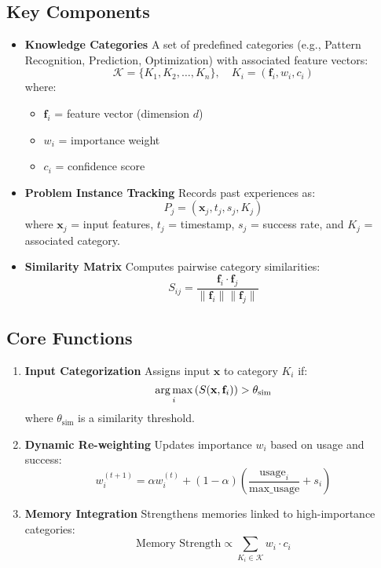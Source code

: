 \documentclass{article}
\begin{document}
\subsection{Key Components}
\begin{itemize}
    \item \textbf{Knowledge Categories}  
    A set of predefined categories (e.g., Pattern Recognition, Prediction, Optimization) with associated feature vectors:
    \[
    \mathcal{K} = \{K_1, K_2, \dots, K_n\}, \quad K_i = (\mathbf{f}_i, w_i, c_i)
    \]
    where:
    \begin{itemize}
        \item $\mathbf{f}_i$ = feature vector (dimension $d$)
        \item $w_i$ = importance weight
        \item $c_i$ = confidence score
    \end{itemize}

    \item \textbf{Problem Instance Tracking}  
    Records past experiences as:
    \[
    P_j = (\mathbf{x}_j, t_j, s_j, K_j)
    \]
    where $\mathbf{x}_j$ = input features, $t_j$ = timestamp, $s_j$ = success rate, and $K_j$ = associated category.

    \item \textbf{Similarity Matrix}  
    Computes pairwise category similarities:
    \[
    S_{ij} = \frac{\mathbf{f}_i \cdot \mathbf{f}_j}{\|\mathbf{f}_i\| \|\mathbf{f}_j\|}
    \]
\end{itemize}

\newcommand{\argmax}{\operatornamewithlimits{arg\,max}}

\subsection{Core Functions}
\begin{enumerate}
    \item \textbf{Input Categorization}  
    Assigns input $\mathbf{x}$ to category $K_i$ if:
    \[
    \argmax_i \left( S(\mathbf{x}, \mathbf{f}_i) \right) > \theta_{\text{sim}}
    \]
    where $\theta_{\text{sim}}$ is a similarity threshold.

    \item \textbf{Dynamic Re-weighting}  
    Updates importance $w_i$ based on usage and success:
    \[
    w_i^{(t+1)} = \alpha w_i^{(t)} + (1-\alpha) \left( \frac{\text{usage}_i}{\text{max\_usage}} + s_i \right)
    \]

    \item \textbf{Memory Integration}  
    Strengthens memories linked to high-importance categories:
    \[
    \text{Memory Strength} \propto \sum_{K_i \in \mathcal{K}} w_i \cdot c_i
    \]
\end{enumerate}
\end{document}
